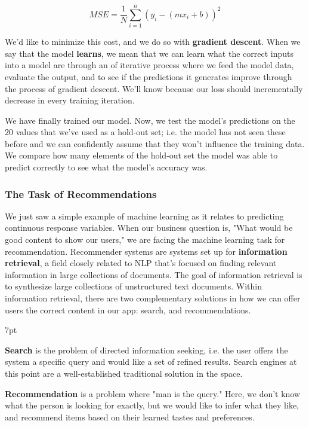 \documentclass[11pt, table]{diazessay} %
\newenvironment{formal}{%
  \def\FrameCommand{%
	\hspace{1pt}%
	{\color{w_lightblue}\vrule width 2pt}%
	{\color{formalshade}\vrule width 4pt}%
	\colorbox{formalshade}%
  }%
  \MakeFramed{\advance\hsize-\width\FrameRestore}%
  \noindent\hspace{-4.55pt}%
  \begin{adjustwidth}{}{7pt}%
  \vspace{2pt}\vspace{2pt}%
}
{%
  \vspace{2pt}\end{adjustwidth}\endMakeFramed%
}
\begin{document}
\begin{sloppypar}
\begin{equation}
MSE =  \frac{1}{N} \sum_{i=1}^{n} (y_i - (m x_i + b))^2
\end{equation}

We'd like to minimize this cost, and we do so with \textbf{gradient descent}. When we say that the model \textbf{learns}, we mean that we can learn what the correct inputs into a model are through an of iterative process where we feed the model data, evaluate the output, and to see if the predictions it generates improve through the process of gradient descent. We'll know because our loss should incrementally decrease in every training iteration.

We have finally trained our model. Now, we test the model's predictions on the 20 values that we've used as a hold-out set; i.e. the model has not seen these before and we can confidently assume that they won't influence the training data. We compare how many elements of the hold-out set the model was able to predict correctly to see what the model's accuracy was.

\subsubsection{The Task of Recommendations}

We just saw a simple example of machine learning as it relates to predicting continuous response variables. When our business question is, "What would be good content to show our users," we are facing the machine learning task for recommendation. Recommender systems are systems set up for \textbf{information retrieval}, a field closely related to NLP that's focused on finding relevant information in large collections of documents.  The goal of information retrieval is to synthesize large collections of unstructured text documents. Within information retrieval, there are two complementary solutions in how we can offer users the correct content in our app: search, and recommendations.

\begin{formal}
\textbf{Search} is the problem of directed \citep{ekstrand2019recommender} information seeking, i.e. the user offers the system a specific query and would like a set of refined results. Search engines at this point are a well-established traditional solution in the space.

\textbf{Recommendation} is a problem where "man is the query." \citep{seaver2022computing}  Here, we don't know what the person is looking for exactly, but we would like to infer what they like, and recommend items based on their learned tastes and preferences.
\end{formal}


\end{sloppypar}
\end{document}
